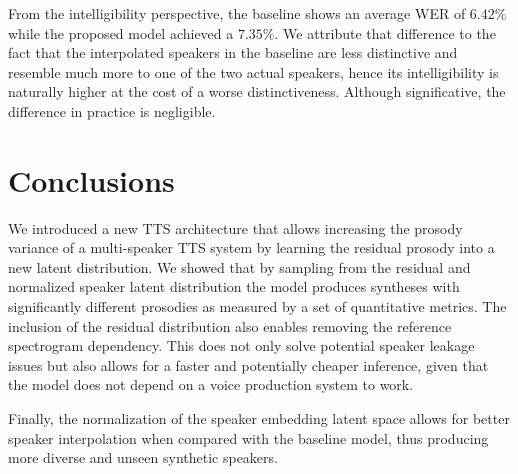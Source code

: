 From the intelligibility perspective, the baseline shows an average WER of $6.42\%$ while the proposed model achieved a $7.35\%$. We attribute that difference to the fact that the interpolated speakers in the baseline are less distinctive and resemble much more to one of the two actual speakers, hence its intelligibility is naturally higher at the cost of a worse distinctiveness. Although significative, the difference in practice is negligible.


\section{Conclusions}


We introduced a new TTS architecture that allows increasing the prosody variance of a multi-speaker TTS system by learning the residual prosody into a new latent distribution. We showed that by sampling from the residual and normalized speaker latent distribution the model produces syntheses with significantly different prosodies as measured by a set of quantitative metrics. The inclusion of the residual distribution also enables removing the reference spectrogram dependency. This does not only solve potential speaker leakage issues but also allows for a faster and potentially cheaper inference, given that the model does not depend on a voice production system to work.


Finally, the normalization of the speaker embedding latent space allows for better speaker interpolation when compared with the baseline model, thus producing more diverse and unseen synthetic speakers.


